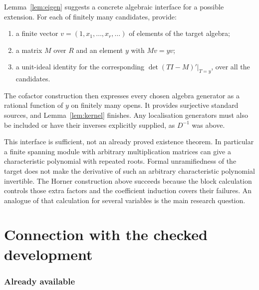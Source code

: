 \documentclass[11pt]{article}
\begin{document}
Lemma~\ref{lem:eigen} suggests a concrete algebraic interface for a
possible extension. For each of finitely many candidates, provide:
\begin{enumerate}
\item a finite vector $v=(1,x_1,\ldots,x_r,\ldots)$ of elements of the
target algebra;
\item a matrix $M$ over $R$ and an element $y$ with $Mv=yv$;
\item a unit-ideal identity for the corresponding
$\det(TI-M)'|_{T=y}$, over all the candidates.
\end{enumerate}
The cofactor construction then expresses every chosen algebra generator
as a rational function of $y$ on finitely many opens. It provides
surjective standard sources, and Lemma~\ref{lem:kernel} finishes.
Any localisation generators must also be included or have their
inverses explicitly supplied, as $D^{-1}$ was above.

This interface is sufficient, not an already proved existence theorem.
In particular a finite spanning module with arbitrary multiplication
matrices can give a characteristic polynomial with repeated roots.
Formal unramifiedness of the target does not make the derivative of
such an arbitrary characteristic polynomial invertible. The Horner
construction above succeeds because the block calculation controls
those extra factors and the coefficient induction covers their failures.
An analogue of that calculation for several variables is the main
research question.

\part{Connection with the checked development}

\section{Already available}
\end{document}
